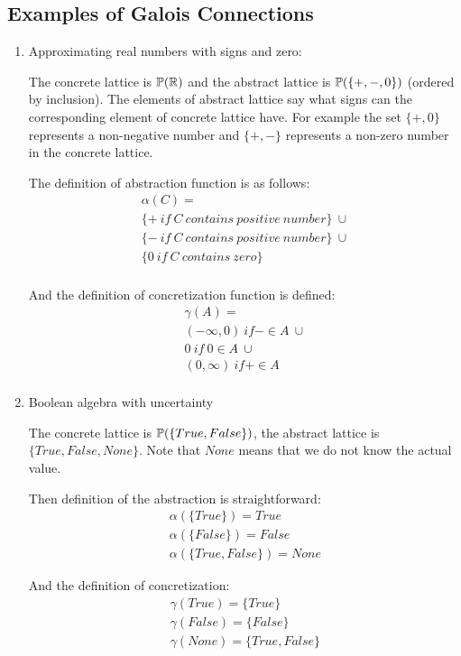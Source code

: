 \subsection*{Examples of Galois Connections}
\begin{enumerate}
    \item Approximating real numbers with signs and zero:

    The concrete lattice is $\mathbb{P}(\mathbb{R})$ and the abstract lattice is $\mathbb{P}(\{+, -, 0\})$ (ordered by %
    inclusion).
    The elements of abstract lattice say what signs can the corresponding element of concrete lattice have.
    For example the set $\{+, 0\}$ represents a non-negative number and $\{+, -\}$ represents a non-zero number in the
    concrete lattice.

    The definition of abstraction function is as follows:
    \begin{gather*}
        \alpha(C) =\\
        \{+ \: if \: C \: contains \: positive \: number\} \: \cup\\
        \{- \: if \: C \: contains \: positive \: number\} \: \cup\\
        \{0 \: if \: C \: contains \: zero\}\\
    \end{gather*}

    And the definition of concretization function is defined:
    \begin{gather*}
        \gamma(A) =\\
        (-\infty, 0) \: if - \in A \: \cup\\
        {0} \: if \: 0 \in A \: \cup\\
        (0, \infty) \: if + \in A \: \\
    \end{gather*}

    \item Boolean algebra with uncertainty

    The concrete lattice is $\mathbb{P}(\{True, False\})$, the abstract lattice is $\{True, False, None\}$.
    Note that $None$ means that we do not know the actual value.

    Then definition of the abstraction is straightforward:
    \begin{gather*}
        \alpha(\{True\}) = True\\
        \alpha(\{False\}) = False\\
        \alpha(\{True, False\}) = None
    \end{gather*}

    And the definition of concretization:
    \begin{gather*}
        \gamma(True) = \{True\}\\
        \gamma(False) = \{False\}\\
        \gamma(None) = \{True, False\}
    \end{gather*}
\end{enumerate}

